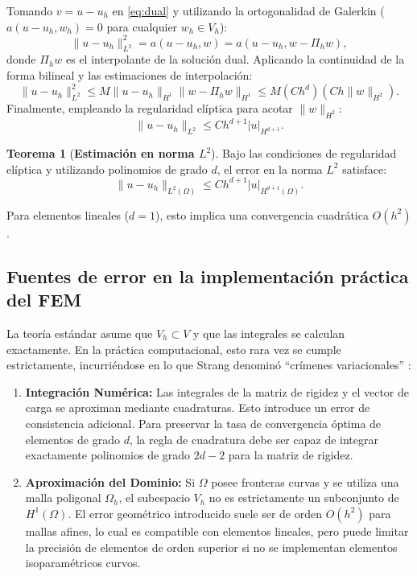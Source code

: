 \documentclass[12pt, letterpaper]{report}
\theoremstyle{definition}
\newtheorem{teorema}{Teorema}[chapter]
\begin{document}
Tomando $v = u - u_h$ en \eqref{eq:dual} y utilizando la ortogonalidad de Galerkin ($a(u-u_h, w_h) = 0$ para cualquier $w_h \in V_h$):
\[
\|u - u_h\|_{L^2}^2 = a(u - u_h, w) = a(u - u_h, w - \Pi_h w),
\]
donde $\Pi_h w$ es el interpolante de la solución dual. Aplicando la continuidad de la forma bilineal y las estimaciones de interpolación:
\[
\|u - u_h\|_{L^2}^2 \leq M \|u - u_h\|_{H^1} \|w - \Pi_h w\|_{H^1} \leq M (C h^d) (C h \|w\|_{H^2}).
\]
Finalmente, empleando la regularidad elíptica para acotar $\|w\|_{H^2}$:
\[
\|u - u_h\|_{L^2} \leq C h^{d+1} |u|_{H^{d+1}}.
\]

\begin{teorema}[\textbf{Estimación en norma $L^2$}]
    Bajo las condiciones de regularidad elíptica y utilizando polinomios de grado $d$, el error en la norma $L^2$ satisface:
    \begin{equation}
        \|u - u_h\|_{L^2(\Omega)} \leq C h^{d+1} |u|_{H^{d+1}(\Omega)}.
    \end{equation}
\end{teorema}
Para elementos lineales ($d=1$), esto implica una convergencia cuadrática $O(h^2)$.

\subsection{Fuentes de error en la implementación práctica del FEM}


La teoría estándar asume que $V_h \subset V$ y que las integrales se calculan exactamente. En la práctica computacional, esto rara vez se cumple estrictamente, incurriéndose en lo que Strang denominó ``crímenes variacionales'' \cite{strang1973analysis}:

\begin{enumerate}
    \item \textbf{Integración Numérica:} Las integrales de la matriz de rigidez y el vector de carga se aproximan mediante cuadraturas. Esto introduce un error de consistencia adicional. Para preservar la tasa de convergencia óptima de elementos de grado $d$, la regla de cuadratura debe ser capaz de integrar exactamente polinomios de grado $2d-2$ para la matriz de rigidez.
    
    \item \textbf{Aproximación del Dominio:} Si $\Omega$ posee fronteras curvas y se utiliza una malla poligonal $\Omega_h$, el subespacio $V_h$ no es estrictamente un subconjunto de $H^1(\Omega)$. El error geométrico introducido suele ser de orden $O(h^2)$ para mallas afines, lo cual es compatible con elementos lineales, pero puede limitar la precisión de elementos de orden superior si no se implementan elementos isoparamétricos curvos.
\end{enumerate}
\end{document}

